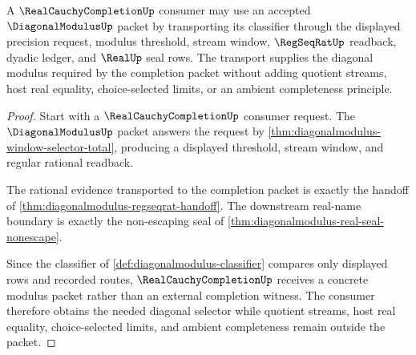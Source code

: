 \begin{theorem}
\label{thm:real-cauchy-completion-modulus-classifier-transport}
A $\RealCauchyCompletionUp$ consumer may use an accepted $\DiagonalModulusUp$ packet by transporting its classifier through the displayed precision request, modulus threshold, stream window, $\RegSeqRatUp$ readback, dyadic ledger, and $\RealUp$ seal rows. The transport supplies the diagonal modulus required by the completion packet without adding quotient streams, host real equality, choice-selected limits, or an ambient completeness principle.
\end{theorem}
\begin{proof}
Start with a $\RealCauchyCompletionUp$ consumer request. The $\DiagonalModulusUp$ packet answers the request by \autoref{thm:diagonalmodulus-window-selector-total}, producing a displayed threshold, stream window, and regular rational readback.

The rational evidence transported to the completion packet is exactly the handoff of \autoref{thm:diagonalmodulus-regseqrat-handoff}. The downstream real-name boundary is exactly the non-escaping seal of \autoref{thm:diagonalmodulus-real-seal-nonescape}.

Since the classifier of \autoref{def:diagonalmodulus-classifier} compares only displayed rows and recorded routes, $\RealCauchyCompletionUp$ receives a concrete modulus packet rather than an external completion witness. The consumer therefore obtains the needed diagonal selector while quotient streams, host real equality, choice-selected limits, and ambient completeness remain outside the packet.
\end{proof}

